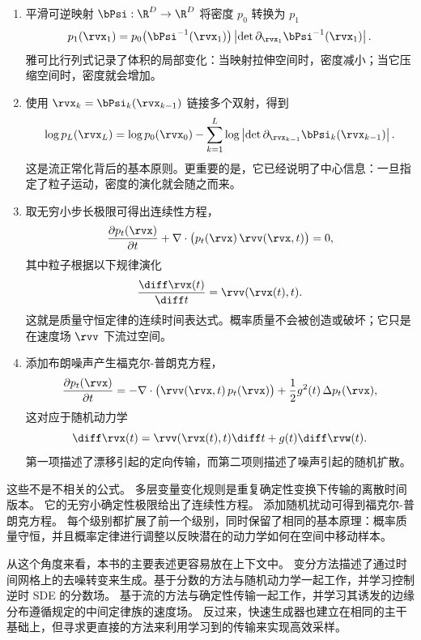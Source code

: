 \begin{enumerate}[leftmargin=2em]
    \item {}
    平滑可逆映射 $\bPsi:\R^D\to\R^D$ 将密度 $p_0$ 转换为 $p_1$
    \[
    p_1(\rvx_1)
    =
    p_0\bigl(\bPsi^{-1}(\rvx_1)\bigr)
    \left|\det \partial_{\rvx_1}\bPsi^{-1}(\rvx_1)\right|.
    \]
    雅可比行列式记录了体积的局部变化：当映射拉伸空间时，密度减小；当它压缩空间时，密度就会增加。\item {}
    使用 $\rvx_k=\bPsi_k(\rvx_{k-1})$ 链接多个双射，得到
    \[
    \log p_L(\rvx_L)
    =
    \log p_0(\rvx_0)
    -
    \sum_{k=1}^L
    \log\left|\det \partial_{\rvx_{k-1}}\bPsi_k(\rvx_{k-1})\right|.
    \]
    这是流正常化背后的基本原则。更重要的是，它已经说明了中心信息：一旦指定了粒子运动，密度的演化就会随之而来。

    \item {}
    取无穷小步长极限可得出连续性方程，
    \[
    \frac{\partial p_t(\rvx)}{\partial t}
    +
    \nabla\cdot\bigl(p_t(\rvx)\,\rvv(\rvx,t)\bigr)
    =
    0,
    \]
    其中粒子根据以下规律演化
    \[
    \frac{\diff \rvx(t)}{\diff t} = \rvv(\rvx(t),t).
    \]
    这就是质量守恒定律的连续时间表达式。概率质量不会被创造或破坏；它只是在速度场 $\rvv$ 下流过空间。

    \item {}
    添加布朗噪声产生福克尔-普朗克方程，
    \[
    \frac{\partial p_t(\rvx)}{\partial t}
    =
    -\nabla\cdot\bigl(\rvv(\rvx,t)\,p_t(\rvx)\bigr)
    +
    \frac{1}{2}g^2(t)\,\Delta p_t(\rvx),
    \]
    这对应于随机动力学
    \[
    \diff\rvx(t) = \rvv(\rvx(t),t)\diff t + g(t)\diff\rvw(t).
    \]
    第一项描述了漂移引起的定向传输，而第二项则描述了噪声引起的随机扩散。
\end{enumerate}

这些不是不相关的公式。
多层变量变化规则是重复确定性变换下传输的离散时间版本。
它的无穷小确定性极限给出了连续性方程。
添加随机扰动可得到福克尔-普朗克方程。
每个级别都扩展了前一个级别，同时保留了相同的基本原理：概率质量守恒，并且概率定律进行调整以反映潜在的动力学如何在空间中移动样本。

从这个角度来看，本书的主要表述更容易放在上下文中。
变分方法描述了通过时间网格上的去噪转变来生成。基于分数的方法与随机动力学一起工作，并学习控制逆时 SDE 的分数场。
基于流的方法与确定性传输一起工作，并学习其诱发的边缘分布遵循规定的中间定律族的速度场。
反过来，快速生成器也建立在相同的主干基础上，但寻求更直接的方法来利用学习到的传输来实现高效采样。

